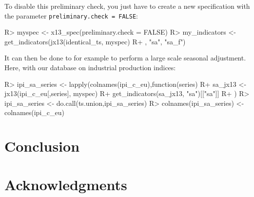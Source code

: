 \documentclass[article]{jss}
\begin{document}
To disable this preliminary check, you just have to create a new
specification with the parameter \texttt{preliminary.check\ =\ FALSE}:

\begin{CodeChunk}

\begin{CodeInput}
R> myspec <- x13_spec(preliminary.check = FALSE)
R> my_indicators <- get_indicators(jx13(identical_ts, myspec)
R+                                 , "sa", "sa_f")
\end{CodeInput}
\end{CodeChunk}

It can then be done to for example to perform a large scale seasonal
adjustment. Here, with our database on industrial production indices:

\begin{CodeChunk}

\begin{CodeInput}
R> ipi_sa_series <- lapply(colnames(ipi_c_eu),function(series){
R+   sa_jx13 <- jx13(ipi_c_eu[,series], myspec)
R+   get_indicators(sa_jx13, "sa")[["sa"]]
R+ })
R> ipi_sa_series <- do.call(ts.union,ipi_sa_series)
R> colnames(ipi_sa_series) <- colnames(ipi_c_eu)
\end{CodeInput}
\end{CodeChunk}

\hypertarget{conclusion}{%
\section{Conclusion}\label{conclusion}}

\hypertarget{acknowledgments}{%
\section*{Acknowledgments}\label{acknowledgments}}

\renewcommand\refname{References}

\end{document}
